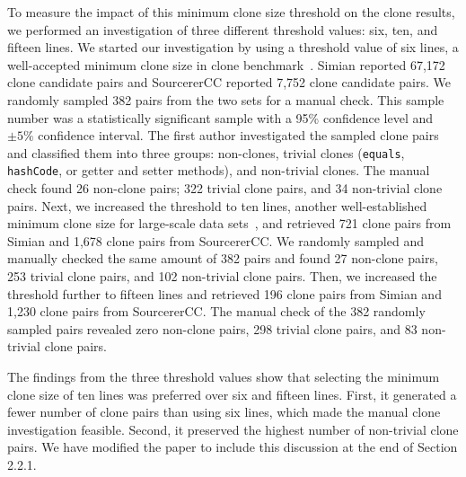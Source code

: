 \documentclass[a4paper,twoside,10pt]{reviewresponse}
\begin{document}
To measure the impact of this minimum clone size threshold on the clone results,
we performed an investigation of three different threshold values: six, ten, and
fifteen lines. We started our investigation by using a threshold value of six
lines, a well-accepted minimum clone size in clone benchmark~\citep{Bellon2007}.
Simian reported 67,172 clone candidate pairs and SourcererCC reported 7,752
clone candidate pairs. We randomly sampled 382 pairs from the two sets for
a manual check. This sample number was a statistically significant sample with a
95\% confidence level and $\pm 5\%$ confidence interval. The first author
investigated the sampled clone pairs and classified them into three groups:
non-clones, trivial clones (\texttt{equals}, \texttt{hashCode}, or getter and
setter methods), and non-trivial clones. The manual check found 26 non-clone
pairs; 322 trivial clone pairs, and 34 non-trivial clone pairs. Next, we
increased the threshold to ten lines, another well-established minimum clone
size for large-scale data sets~\citep{Sajnani2016}, and retrieved 721 clone pairs
from Simian and 1,678 clone pairs from SourcererCC. We randomly sampled and
manually checked the same amount of 382 pairs and found 27 non-clone pairs, 253
trivial clone pairs, and 102 non-trivial clone pairs. Then, we increased the
threshold further to fifteen lines and retrieved 196 clone pairs from Simian and
1,230 clone pairs from SourcererCC. The manual check of the 382 randomly sampled
pairs revealed zero non-clone pairs, 298 trivial clone pairs, and 83 non-trivial
clone pairs.

The findings from the three threshold values show that selecting the minimum
clone size of ten lines was preferred over six and fifteen lines. First, it
generated a fewer number of clone pairs than using six lines, which made the
manual clone investigation feasible. Second, it preserved the highest number of
non-trivial clone pairs.
We have modified the paper to include this discussion at the end of Section
2.2.1.

\end{document}

